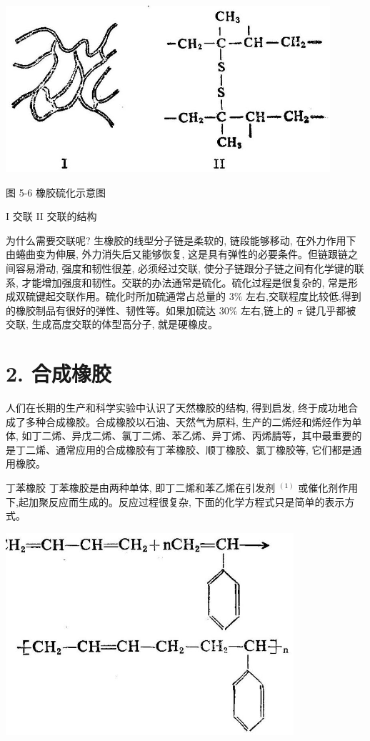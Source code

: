\documentclass[10pt]{article}
\begin{document}
\begin{center}
\includegraphics[max width=0.9\textwidth]{images/01912d16-be99-77bb-9535-4f3ed8d9946f_198_241078.jpg}
\end{center}

图 5-6 橡胶硫化示意图

I 交联 II 交联的结构

为什么需要交联呢? 生橡胶的线型分子链是柔软的, 链段能够移动, 在外力作用下由蜷曲变为伸展, 外力消失后又能够恢复, 这是具有弹性的必要条件。但链跟链之间容易滑动, 强度和韧性很差, 必须经过交联, 使分子链跟分子链之间有化学键的联系, 才能增加强度和韧性。交联的办法通常是硫化。硫化过程是很复杂的, 常是形成双硫键起交联作用。硫化时所加硫通常占总量的 \(3\%\) 左右,交联程度比较低,得到的橡胶制品有很好的弹性、韧性等。如果加硫达 \({30}\%\) 左右,链上的 \(\pi\) 键几乎都被交联, 生成高度交联的体型高分子, 就是硬橡皮。

\section*{2. 合成橡胶}

人们在长期的生产和科学实验中认识了天然橡胶的结构, 得到启发, 终于成功地合成了多种合成橡胶。合成橡胶以石油、天然气为原料, 生产的二烯烃和烯烃作为单体, 如丁二烯、异戊二烯、氯丁二烯、苯乙烯、异丁烯、丙烯腈等，其中最重要的是丁二烯、通常应用的合成橡胶有丁苯橡胶、顺丁橡胶、氯丁橡胶等, 它们都是通用橡胶。

丁苯橡胶 丁苯橡胶是由两种单体, 即丁二烯和苯乙烯在引发剂 \({}^{\left( 1\right) }\) 或催化剂作用下,起加聚反应而生成的。反应过程很复杂, 下面的化学方程式只是简单的表示方式。

\begin{center}
\includegraphics[max width=0.8\textwidth]{images/01912d16-be99-77bb-9535-4f3ed8d9946f_199_860443.jpg}
\end{center}
\end{document}
